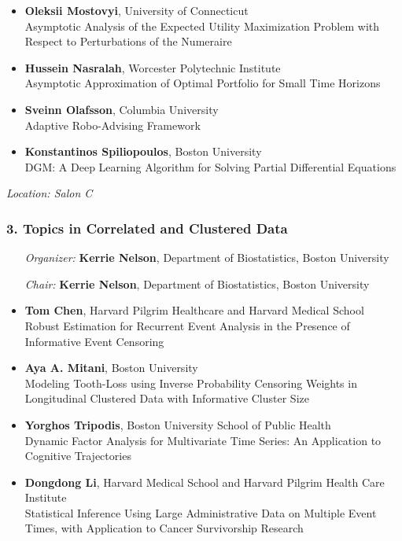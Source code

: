 \begin{itemize}
\item \textbf{Oleksii Mostovyi}, University of Connecticut \\
Asymptotic Analysis of the Expected Utility Maximization Problem with Respect to Perturbations of the Numeraire
\item \textbf{Hussein Nasralah}, Worcester Polytechnic Institute \\
Asymptotic Approximation of Optimal Portfolio for Small Time Horizons
\item \textbf{Sveinn Olafsson}, Columbia University \\
Adaptive Robo-Advising Framework
\item \textbf{Konstantinos Spiliopoulos}, Boston University \\
DGM: A Deep Learning Algorithm for Solving Partial Differential Equations
\end{itemize}

\emph{Location: Salon C}

\subsubsection*{3. Topics in Correlated and Clustered Data}

\begin{enumerate}[align=left]
\item [\emph{Organizer:}] \textbf{Kerrie Nelson}, Department of Biostatistics, Boston University
\item [\emph{Chair:}] \textbf{Kerrie Nelson}, Department of Biostatistics, Boston University
\end{enumerate}

\begin{itemize}
\item \textbf{Tom Chen}, Harvard Pilgrim Healthcare and Harvard Medical School \\
Robust Estimation for Recurrent Event Analysis in the Presence of Informative Event Censoring
\item \textbf{Aya A. Mitani}, Boston University \\
Modeling Tooth-Loss using Inverse Probability Censoring Weights in Longitudinal Clustered Data with Informative Cluster Size
\item \textbf{Yorghos Tripodis}, Boston University School of Public Health \\
Dynamic Factor Analysis for Multivariate Time Series: An Application to Cognitive Trajectories
\item \textbf{Dongdong Li}, Harvard Medical School and Harvard Pilgrim Health Care Institute \\
Statistical Inference Using Large Administrative Data on Multiple Event Times, with Application to Cancer Survivorship Research
\end{itemize}

